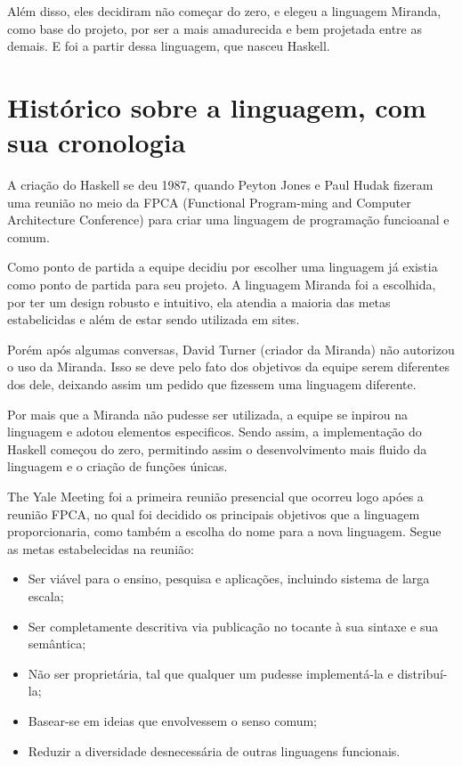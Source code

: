 \documentclass[12pt,openright,a4paper,brazil]{abntex2}
\begin{document}
    Além disso, eles decidiram não começar do zero, e elegeu a linguagem Miranda, como base do projeto, por ser a mais amadurecida e bem projetada entre as demais. E 
    foi a partir dessa linguagem, que nasceu Haskell.

    \chapter{Histórico sobre a linguagem, com sua cronologia}

    A criação do Haskell se deu 1987, quando Peyton Jones e Paul Hudak fizeram uma reunião no meio da FPCA (Functional  Program-ming and Computer Architecture Conference)
    para criar uma linguagem de programação funcioanal e comum. 
    
    Como ponto de partida a equipe decidiu por escolher uma linguagem já existia como ponto de partida para seu projeto.
    A linguagem Miranda foi a escolhida, por ter um design robusto e intuitivo, ela atendia a maioria das metas estabelicidas e 
    além de estar sendo utilizada em sites. 

    Porém após algumas conversas, David Turner (criador da Miranda) não autorizou o uso da Miranda. Isso se deve pelo fato dos objetivos
    da equipe serem diferentes dos dele, deixando assim um pedido que fizessem uma linguagem diferente.

    Por mais que a Miranda não pudesse ser utilizada, a equipe se inpirou na linguagem e adotou elementos especificos.  
    Sendo assim, a implementação do Haskell começou do zero, permitindo assim o desenvolvimento mais fluido da linguagem 
    e o criação de funções únicas.
    
    The Yale Meeting foi a primeira reunião presencial que ocorreu logo apóes a reunião FPCA, no qual foi decidido
    os principais objetivos que a linguagem proporcionaria, como também a escolha do nome para a nova linguagem. 
    Segue as metas estabelecidas na reunião:

    \begin{itemize}
      \item Ser viável para o ensino, pesquisa e aplicações, incluindo sistema de larga escala;
      \item Ser completamente descritiva via publicação no tocante à sua sintaxe e sua semântica;
      \item Não ser proprietária, tal que qualquer um pudesse implementá-la e distribuí-la;
      \item Basear-se em ideias que envolvessem o senso comum;
      \item Reduzir a diversidade desnecessária de outras linguagens funcionais.
    \end{itemize}
\end{document}
